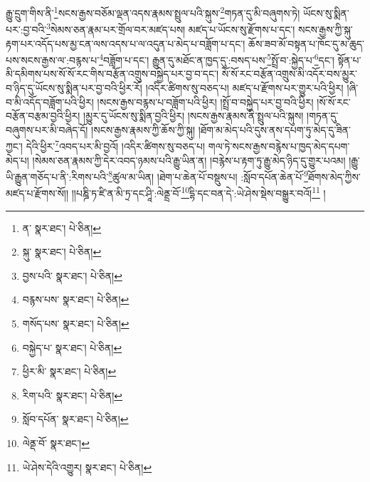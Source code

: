 རྒྱུ་དྲུག་གིས་ནི་\footnote{ན་  སྣར་ཐང་།  པེ་ཅིན། }སངས་རྒྱས་བཅོམ་ལྡན་འདས་རྣམས་སྤྲུལ་པའི་སྐུས་\footnote{སྐུ་  སྣར་ཐང་།  པེ་ཅིན། }གཏན་དུ་མི་བཞུགས་ཏེ། ཡོངས་སུ་སྨིན་པར་:བྱ་བའི་\footnote{བྱས་པའི་  སྣར་ཐང་།  པེ་ཅིན། }སེམས་ཅན་རྣམ་པར་གྲོལ་བར་མཛད་པས། མཛད་པ་ཡོངས་སུ་རྫོགས་པ་དང་། སངས་རྒྱས་ཀྱི་སྐུ་རྟག་པར་འདོད་པས་མྱ་ངན་ལས་འདས་པ་ལ་འདུན་པ་མེད་པ་བཟློག་པ་དང་། ཆོས་ཟབ་མོ་བསྟན་པ་ཁོང་དུ་མ་ཆུད་པས་སངས་རྒྱས་ལ་:བརྙས་པ་\footnote{བརྙས་པས་  སྣར་ཐང་།  པེ་ཅིན། }བཟློག་པ་དང་། རྒྱུན་དུ་མཐོང་ན་ཁྱད་དུ་:བསད་པས་\footnote{གསོད་པས་  སྣར་ཐང་།  པེ་ཅིན། }སྤྲོ་བ་:སྐྱེད་པ་\footnote{བསྐྱེད་པ་  སྣར་ཐང་།  པེ་ཅིན། }དང་། སྟོན་པ་མི་དམིགས་པས་སོ་སོ་རང་གིས་བརྩོན་འགྲུས་བསྐྱེད་པར་བྱ་བ་དང་། སོ་སོ་རང་བརྩོན་འགྲུས་མི་འདོར་བས་མྱུར་བ་ཉིད་དུ་ཡོངས་སུ་སྨིན་པར་བྱ་བའི་ཕྱིར་རོ། །འདིར་ཚིགས་སུ་བཅད་པ། མཛད་པ་རྫོགས་པར་གྱུར་པའི་ཕྱིར། །ཞི་བ་མི་འདོད་བཟློག་པའི་ཕྱིར། །སངས་རྒྱས་བརྙས་པ་བཟློག་པའི་ཕྱིར། །སྤྲོ་བ་བསྐྱེད་པར་བྱ་བའི་ཕྱིར། །སོ་སོ་རང་བརྩོན་བརྩམ་བྱའི་ཕྱིར། །མྱུར་དུ་ཡོངས་སུ་སྨིན་བྱའི་ཕྱིར། །སངས་རྒྱས་རྣམས་ནི་སྤྲུལ་པའི་སྐུས། །གཏན་དུ་བཞུགས་པར་མི་བཞེད་དོ། །སངས་རྒྱས་རྣམས་ཀྱི་ཆོས་ཀྱི་སྐུ། །ཐོག་མ་མེད་པའི་དུས་ནས་དཔག་ཏུ་མེད་དུ་ཟིན་ཀྱང་། དེའི་ཕྱིར་\footnote{ཕྱིར་མི་  སྣར་ཐང་།  པེ་ཅིན། }འབད་པར་མི་བྱའོ། །འདིར་ཚིགས་སུ་བཅད་པ། གལ་ཏེ་སངས་རྒྱས་བརྙེས་པ་ཁྱད་མེད་དཔག་མེད་པ། །སེམས་ཅན་རྣམས་ཀྱི་དེར་འབད་ཉམས་པའི་རྒྱུ་ཡིན་ན། །བརྙེས་པ་རྟག་ཏུ་རྒྱུ་མེད་ཉིད་དུ་གྱུར་པའམ། །རྒྱུ་ཡི་རྒྱུན་གཅོད་པ་ནི་:རིགས་པའི་\footnote{རིག་པའི་  སྣར་ཐང་།  པེ་ཅིན། }ཚུལ་མ་ཡིན། །ཐེག་པ་ཆེན་པོ་བསྡུས་པ། :སློབ་དཔོན་ཆེན་པོ་\footnote{སློབ་དཔོན་  སྣར་ཐང་།  པེ་ཅིན། }ཐོགས་མེད་ཀྱིས་མཛད་པ་རྫོགས་སོ།། །།པཎྜི་ཏ་ཛི་ན་མི་ཏྲ་དང་ཤཱི་:ལེནྡྲ་བོ་\footnote{ལེནྡ་བོ་  སྣར་ཐང་། }དྷི་དང་བན་དེ་:ཡེ་ཤེས་སྡེས་བསྒྱུར་བའོ།\footnote{ཡེ་ཤེས་དེའི་འགྱུར།  སྣར་ཐང་།  པེ་ཅིན། } །